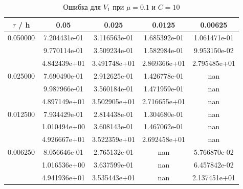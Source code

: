 \documentclass[specialist,subf,href,colorlinks=true,12pt
,times,mtpro,specialist
]{disser}
\begin{document}
\begin{table}[H]
\small
\caption{Ошибка для $V_1$ при $\mu=0.1$ и $C = 10$}
\begin{center}
\begin{tabular}{|c|c|c|c|c|}
\hline
$\tau$ / h & 0.05 & 0.025 & 0.0125 & 0.00625 \\
\hline
0.050000 & 7.204431e-01  & 3.116563e-01  & 1.685392e-01  & 1.061471e-01 \\
 & 9.770114e-01  & 3.509234e-01  & 1.582984e-01  & 9.953150e-02 \\
 & 4.842439e+01  & 3.491748e+01  & 2.869366e+01  & 2.795485e+01 \\
\hline
0.025000 & 7.690490e-01  & 2.912625e-01  & 1.426778e-01  & nan \\
 & 9.987966e-01  & 3.560184e-01  & 1.471959e-01  & nan \\
 & 4.897149e+01  & 3.502905e+01  & 2.716655e+01  & nan \\
\hline
0.012500 & 7.934429e-01  & 2.814438e-01  & 1.304680e-01  & nan \\
 & 1.010494e+00  & 3.608143e-01  & 1.467062e-01  & nan \\
 & 4.926667e+01  & 3.522359e+01  & 2.692458e+01  & nan \\
\hline
0.006250 & 8.056646e-01  & 2.765132e-01  & nan  & 5.766870e-02 \\
 & 1.016536e+00  & 3.637599e-01  & nan  & 6.457842e-02 \\
 & 4.941936e+01  & 3.535443e+01  & nan  & 2.137451e+01 \\
\hline
\end{tabular}
\end{center}
\end{table}
\end{document}
